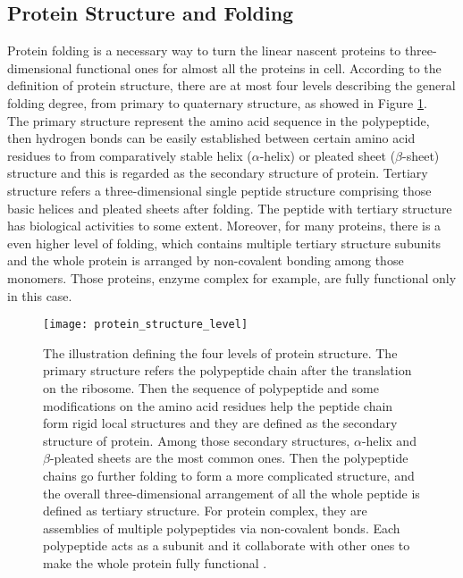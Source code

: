 \subsection{Protein Structure and Folding}
Protein folding is a necessary way to turn the linear nascent proteins to three-dimensional functional ones for almost all the proteins in cell. According to the definition of protein structure, there are at most four levels describing the general folding degree, from primary to quaternary structure, as showed in Figure \ref{fig:protein_structure_level}.\\
The primary structure represent the amino acid sequence in the polypeptide, then hydrogen bonds can be easily established between certain amino acid residues to from comparatively stable helix ($\alpha$-helix) or pleated sheet ($\beta$-sheet) structure and this is regarded as the secondary structure of protein. Tertiary structure refers a three-dimensional single peptide structure comprising those basic helices and pleated sheets after folding. The peptide with tertiary structure has biological activities to some extent. Moreover, for many proteins, there is a even higher level of folding, which contains multiple tertiary structure subunits and the whole protein is arranged by non-covalent bonding among those monomers. Those proteins, enzyme complex for example, are fully functional only in this case.
\begin{figure}[h]
	\centering
	\texttt{[image: protein\_structure\_level]}
	\caption[The four levels of protein structure.]
	{The illustration defining the four levels of protein structure. The primary structure refers the polypeptide chain after the translation on the ribosome. Then the sequence of polypeptide and some modifications on the amino acid residues help the peptide chain form rigid local structures and they are defined as the secondary structure of protein. Among those secondary structures, $\alpha$-helix and $\beta$-pleated sheets are the most common ones. Then the polypeptide chains go further folding to form a more complicated structure, and the overall three-dimensional arrangement of all the whole peptide is defined as tertiary structure. For protein complex, they are assemblies of multiple polypeptides via non-covalent bonds. Each polypeptide acts as a subunit and it collaborate with other ones to make the whole protein fully functional \citep{silva2014protein}.}
	\label{fig:protein_structure_level}
\end{figure}
